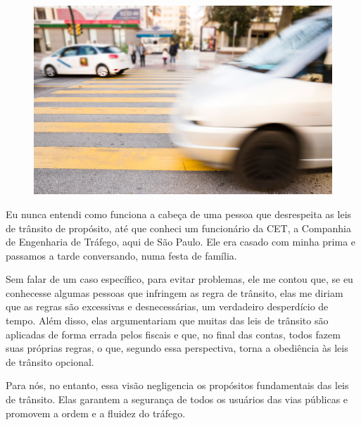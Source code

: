 \begin{myquote}

\begin{figure}[H]
\centering
\includegraphics[scale=0.25]{./imgSAEB_7_POR/media/image50.png}
\end{figure}

Eu nunca entendi como funciona a cabeça de uma pessoa que desrespeita as leis
de trânsito de propósito, até que conheci um funcionário da CET, a Companhia
de Engenharia de Tráfego, aqui de São Paulo. Ele era casado com minha prima e
passamos a tarde conversando, numa festa de família. 

Sem falar de um caso específico, para evitar problemas, ele me contou que, se
eu conhecesse algumas pessoas que infringem as regra de trânsito,
elas me diriam que as regras são excessivas e desnecessárias, um
verdadeiro desperdício de tempo. Além disso, elas argumentariam que muitas das
leis de trânsito são aplicadas de forma errada pelos fiscais e que, no final
das contas, todos fazem suas próprias regras, o que, segundo essa perspectiva,
torna a obediência às leis de trânsito opcional.

Para nós, no entanto, essa visão negligencia os propósitos fundamentais das leis 
de trânsito. Elas garantem a segurança de todos os usuários das vias públicas e 
promovem a ordem e a fluidez do tráfego.


\end{myquote}


